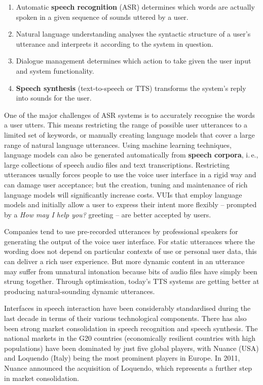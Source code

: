 \documentclass[]{../../metanetpaper}
\begin{document}
\begin{multicols}{2}
\begin{enumerate}
\item Automatic \textbf{speech recognition} (ASR) determines which words are actually spoken in a given sequence of sounds uttered by a user.  
\item Natural language understanding analyses the syntactic structure of a user’s utterance and interprets it according to the system in question.
\item Dialogue management determines which action to take given the user input and system functionality.   
\item \textbf{Speech synthesis} (text-to-speech or TTS) transforms the system’s reply into sounds for the user.
\end{enumerate}

One of the major challenges of ASR systems is to accurately recognise the words a user utters. This means restricting the range of possible user utterances to a limited set of keywords, or manually creating language models that cover a large range of natural language utterances. Using machine learning techniques, language models can also be generated automatically from \textbf{speech corpora}, i.\,e., large collections of speech audio files and text transcriptions. Restricting utterances usually forces people to use the voice user interface in a rigid way and can damage user acceptance; but the creation, tuning and maintenance of rich language models will significantly increase costs. VUIs that employ language models and initially allow a user to express their intent more flexibly -- prompted by a \textit{How may I help you?} greeting -- are better accepted by users.


Companies tend to use pre-recorded utterances by professional speakers for generating the output of the voice user interface. For static utterances where the wording does not depend on particular contexts of use or personal user data, this can deliver a rich user experience. But more dynamic content in an utterance may suffer from unnatural intonation because bits of audio files have simply been strung together. Through optimisation, today’s TTS systems are getting better at producing natural-sounding dynamic utterances.

Interfaces in speech interaction have been considerably standardised during the last decade in terms of their various technological components. There has also been strong market consolidation in speech recognition and speech synthesis. The national markets in the G20 countries (economically resilient countries with high populations) have been dominated by just five global players, with Nuance (USA) and Loquendo (Italy) being the most prominent players in Europe. In 2011, Nuance announced the acquisition of Loquendo, which represents a further step in market consolidation.


\end{multicols}
\end{document}
